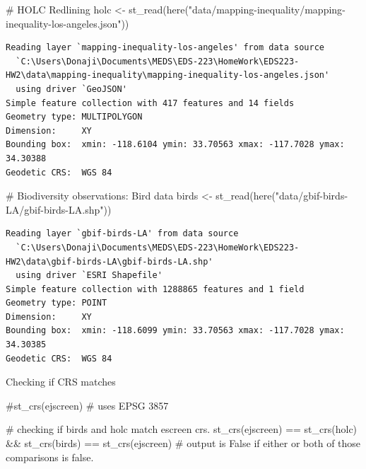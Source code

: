 \documentclass[
  letterpaper,
  DIV=11,
  numbers=noendperiod]{scrartcl}
\newenvironment{Shaded}{\begin{snugshade}}{\end{snugshade}}
\newcommand{\CommentTok}[1]{\textcolor[rgb]{0.37,0.37,0.37}{#1}}
\newcommand{\FunctionTok}[1]{\textcolor[rgb]{0.28,0.35,0.67}{#1}}
\newcommand{\NormalTok}[1]{\textcolor[rgb]{0.00,0.23,0.31}{#1}}
\newcommand{\OtherTok}[1]{\textcolor[rgb]{0.00,0.23,0.31}{#1}}
\newcommand{\SpecialCharTok}[1]{\textcolor[rgb]{0.37,0.37,0.37}{#1}}
\newcommand{\StringTok}[1]{\textcolor[rgb]{0.13,0.47,0.30}{#1}}
\begin{document}
\begin{Shaded}
\begin{Highlighting}[]
\CommentTok{\# HOLC Redlining}
\NormalTok{ holc }\OtherTok{\textless{}{-}} \FunctionTok{st\_read}\NormalTok{(}\FunctionTok{here}\NormalTok{(}\StringTok{"data/mapping{-}inequality/mapping{-}inequality{-}los{-}angeles.json"}\NormalTok{))}
\end{Highlighting}
\end{Shaded}

\begin{verbatim}
Reading layer `mapping-inequality-los-angeles' from data source 
  `C:\Users\Donaji\Documents\MEDS\EDS-223\HomeWork\EDS223-HW2\data\mapping-inequality\mapping-inequality-los-angeles.json' 
  using driver `GeoJSON'
Simple feature collection with 417 features and 14 fields
Geometry type: MULTIPOLYGON
Dimension:     XY
Bounding box:  xmin: -118.6104 ymin: 33.70563 xmax: -117.7028 ymax: 34.30388
Geodetic CRS:  WGS 84
\end{verbatim}

\begin{Shaded}
\begin{Highlighting}[]
\CommentTok{\# Biodiversity observations: Bird data}
\NormalTok{birds }\OtherTok{\textless{}{-}} \FunctionTok{st\_read}\NormalTok{(}\FunctionTok{here}\NormalTok{(}\StringTok{"data/gbif{-}birds{-}LA/gbif{-}birds{-}LA.shp"}\NormalTok{))}
\end{Highlighting}
\end{Shaded}

\begin{verbatim}
Reading layer `gbif-birds-LA' from data source 
  `C:\Users\Donaji\Documents\MEDS\EDS-223\HomeWork\EDS223-HW2\data\gbif-birds-LA\gbif-birds-LA.shp' 
  using driver `ESRI Shapefile'
Simple feature collection with 1288865 features and 1 field
Geometry type: POINT
Dimension:     XY
Bounding box:  xmin: -118.6099 ymin: 33.70563 xmax: -117.7028 ymax: 34.30385
Geodetic CRS:  WGS 84
\end{verbatim}

Checking if CRS matches

\begin{Shaded}
\begin{Highlighting}[]
\CommentTok{\#st\_crs(ejscreen) \# uses EPSG 3857}

\CommentTok{\# checking if birds and holc match escreen crs.}
\FunctionTok{st\_crs}\NormalTok{(ejscreen) }\SpecialCharTok{==} \FunctionTok{st\_crs}\NormalTok{(holc) }\SpecialCharTok{\&\&} \FunctionTok{st\_crs}\NormalTok{(birds) }\SpecialCharTok{==} \FunctionTok{st\_crs}\NormalTok{(ejscreen) }\CommentTok{\# output is False if either or both of those comparisons is false. }
\end{Highlighting}
\end{Shaded}
\end{document}
